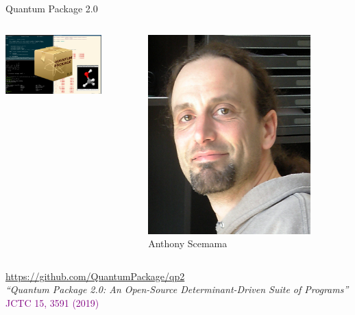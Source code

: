 \documentclass[aspectratio=169,9pt]{beamer}
\newcommand{\pub}[1]{{\small \textcolor{purple}{#1}}}
\begin{document}
\begin{frame}{Quantum Package 2.0}
        \begin{columns}
                \begin{column}{0.80\textwidth}
                    \centering
                    \includegraphics[width=0.75\textwidth]{fig/TOC_QP2}
                \end{column}
                \begin{column}{0.20\textwidth}
                        \includegraphics[width=0.8\textwidth]{fig/Anthony}
                        \\
                        Anthony Scemama
                \end{column}
        \end{columns}
        \centering
        \bigskip
    	\url{https://github.com/QuantumPackage/qp2}
        \\
        \bigskip
        {\em ``Quantum Package 2.0: An Open-Source Determinant-Driven Suite of Programs''}\\
        \bigskip
	\pub{JCTC 15, 3591 (2019)}
\end{frame}
\end{document}
